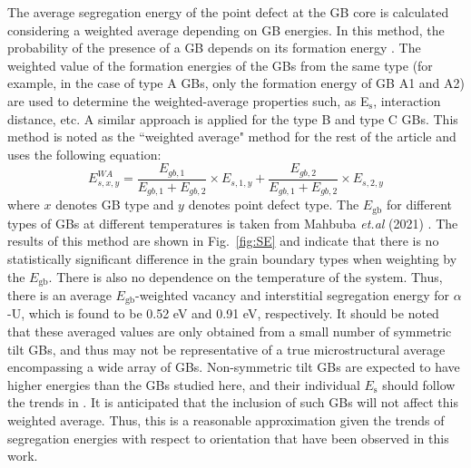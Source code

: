 \documentclass[review]{elsarticle}
\begin{document}
The average segregation energy of the point defect at the GB core is calculated considering a weighted average depending on GB energies. In this method, the probability of the presence of a GB depends on its formation energy \cite{WILLIAMS201545}. The weighted value of the formation energies of the GBs from the same type (for example, in the case of type A GBs, only the formation energy of GB A1 and A2) are used to determine the weighted-average properties such, as E$_\mathrm{s}$, interaction distance, etc. A similar approach is applied for the type B and type C GBs. This method is noted as the ``weighted average" method for the rest of the article and uses the following equation:
\begin{equation}
\label{eq:weight}
E_{s,x,y}^{WA} = \frac{E_{gb,1}}{E_{gb,1}+E_{gb,2}} \times E_{s,1,y} + \frac{E_{gb,2}}{E_{gb,1}+E_{gb,2}} \times E_{s,2,y}
\end{equation} 
\noindent where $x$ denotes GB type and $y$ denotes point defect type. The $E_{\mathrm{gb}}$ for different types of GBs at different temperatures is taken from Mahbuba \textit{et.al} (2021) \cite{MAHBUBA2021153072}. The results of this method are shown in Fig.~\ref{fig:SE} and indicate that there is no statistically significant difference in the grain boundary types when weighting by the $E_{\mathrm{gb}}$. There is also no dependence on the temperature of the system. Thus, there is an average $E_{\mathrm{gb}}$-weighted vacancy and interstitial segregation energy for $\alpha$-U, which is found to be 0.52 eV and 0.91 eV, respectively. It should be noted that these averaged values are only obtained from a small number of symmetric tilt GBs, and thus may not be representative of a true microstructural average encompassing a wide array of GBs. Non-symmetric tilt GBs are expected to have higher energies than the GBs studied here, and their individual $E_{\mathrm{s}}$ should follow the trends in . It is anticipated that the inclusion of such GBs will not affect this weighted average. Thus, this is a reasonable approximation given the trends of segregation energies with respect to orientation that have been observed in this work. 
\end{document}
